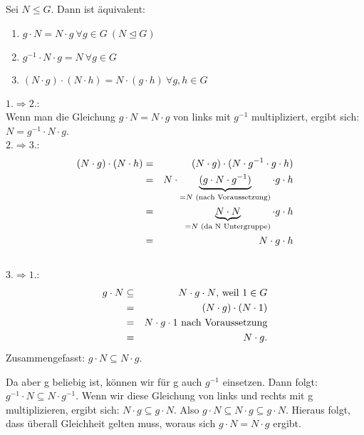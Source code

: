 \documentclass[10pt]{scrbook}
\begin{document}
\begin{Sa}
Sei $N\leq G$. Dann ist äquivalent:
\begin{enumerate}
	\item $g\cdot N = N \cdot g\ \forall g\in G\ (N\trianglelefteq G)$
	\item $g^{-1} \cdot N\cdot g  = N\ \forall g\in G$
	\item $(N\cdot g)\cdot (N\cdot h)=N\cdot(g\cdot h)\ \forall g,h\in G$
\end{enumerate}
\end{Sa}
\begin{bew}

$1.\Rightarrow 2.$:\\
Wenn man die Gleichung $g\cdot N = N \cdot g$ von links mit $g^{-1}$ multipliziert, ergibt sich: $N=g^{-1}\cdot N \cdot g$.\\

$2.\Rightarrow 3.$:\\
\begin{eqnarray*}
	(N\cdot g)\cdot (N\cdot h) & = & (N\cdot g)\cdot (N\cdot g^{-1}\cdot g\cdot h)\\
	& = & N\cdot \underbrace{(g\cdot N\cdot g^{-1})}_{=N\textnormal{ (nach Voraussetzung)}}\cdot g\cdot h \\
	& = & \underbrace{N\cdot N}_{=N\textnormal{ (da N Untergruppe)}} \cdot g \cdot h \\
	& = & N\cdot g \cdot h
\end{eqnarray*}\\


$3.\Rightarrow 1.$:\\
\begin{eqnarray*}
	g\cdot N & \subseteq & N\cdot g \cdot N\textnormal{, weil }1\in G\\
	&=& (N\cdot g)\cdot (N\cdot 1)\\
	&=& N\cdot g\cdot 1\textnormal{ nach Voraussetzung}\\
	&=& N\cdot g.
\end{eqnarray*}
Zusammengefasst: $g\cdot N\subseteq N\cdot g$.

Da aber g beliebig ist, können wir für g auch $g^{-1}$ einsetzen. Dann folgt: $g^{-1}\cdot N\subseteq N\cdot g^{-1}$. Wenn wir diese Gleichung von links und rechts mit g multiplizieren, ergibt sich: $N\cdot g\subseteq g\cdot N$. Also $g\cdot N\subseteq N\cdot g\subseteq g\cdot N$. Hieraus folgt, dass überall Gleichheit gelten muss, woraus sich $g\cdot N = N \cdot g$ ergibt.
\end{bew}
\end{document}
